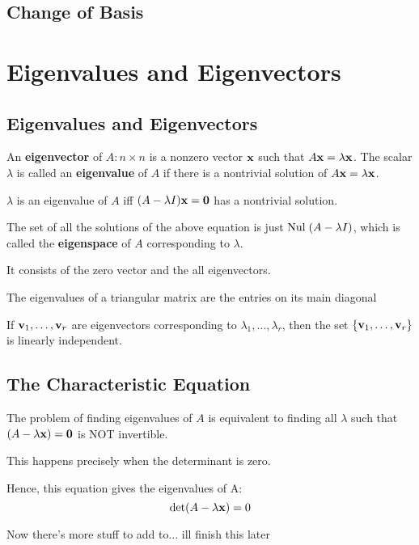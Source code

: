\documentclass{report}
\begin{document}
\section{Change of Basis}

\chapter{Eigenvalues and Eigenvectors}
\setcounter{theorem}{0}
\setcounter{definition}{0}

\section{Eigenvalues and Eigenvectors}

\begin{definition}
    An \textbf{eigenvector} of $A: n \times n$ is a nonzero vector $\mathbf{x}$ 
    such that $A \mathbf{x} = \lambda \mathbf{x}$. The scalar $\lambda$ is called an 
    \textbf{eigenvalue} of $A$ if there is a nontrivial solution of $A \mathbf{x} = \lambda \mathbf{x}$.
\end{definition}

$\lambda$ is an eigenvalue of $A$ iff $(A - \lambda I) \mathbf{x} = \mathbf{0}$ has a nontrivial solution.

The set of all the solutions of the above equation is just $\mathrm{Nul}\; (A - \lambda I)$, which is called the
\textbf{eigenspace} of $A$ corresponding to $\lambda$. 

It consists of the zero vector and the all eigenvectors.

\begin{theorem}
    The eigenvalues of a triangular matrix are the entries on its main diagonal
\end{theorem}

\begin{theorem}
    If $\mathbf{v}_1, \ldots, \mathbf{v}_r$ are eigenvectors corresponding to $\lambda_1, \ldots, \lambda_r$, 
    then the set $\{\mathbf{v}_1, \ldots, \mathbf{v}_r\}$ is linearly independent.
\end{theorem}

\section{The Characteristic Equation}

The problem of finding eigenvalues of $A$ is equivalent to finding all $\lambda$
such that $(A - \lambda \mathbf{x}) = \mathbf{0}$ is NOT invertible.

This happens precisely when the determinant is zero.

Hence, this equation gives the eigenvalues of A: \[\det (A - \lambda \mathbf{x}) = 0\]

Now there's more stuff to add to... ill finish this later
\end{document}
